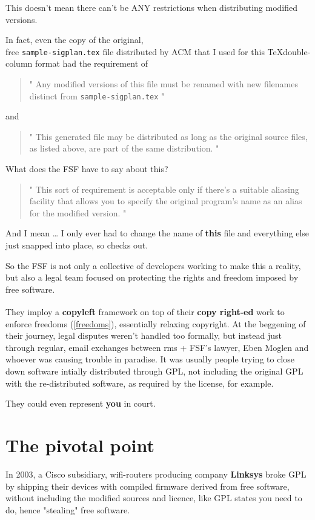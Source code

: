 \documentclass[sigplan,screen]{acmart}
\begin{document}
This doesn't mean there can't be ANY restrictions when distributing modified versions.

In fact, even the copy of the original, \\
free \verb|sample-sigplan.tex| file distributed by ACM that I used for this \TeX   double-column format had the requirement of

\begin{quote}
	"
	Any modified versions of this file must be renamed
 with new filenames distinct from \verb|sample-sigplan.tex|
	"
\end{quote}
and
\begin{quote}
	"
	This generated file may be distributed as long as the
 original source files, as listed above, are part of the
 same distribution.
	"
\end{quote}
What does the FSF have to say about this?
\begin{quote}
	"
	This sort of requirement is acceptable only if there's a suitable aliasing facility that allows you to specify the original program's name as an alias for the modified version.
	"
\end{quote}
And I mean … I only ever had to change the name of \textbf{this} file and everything else just snapped into place, so checks out.

So the FSF is not only a collective of developers working to make this a reality, but also a legal team focused on protecting the rights and freedom imposed by free software.

They imploy a \textbf{copyleft}\textsuperscript{\textcopyleft} framework on top of their \textbf{copy right-ed}\textsuperscript{\textcopyright} work to enforce freedoms (\ref{freedoms}), essentially relaxing copyright. At the beggening of their journey, legal disputes weren't handled too formally, but instead just through regular, email exchanges between rms + FSF's lawyer, Eben Moglen and whoever was causing trouble in paradise. It was usually people trying to close down software intially distributed through GPL, not including the original GPL with the re-distributed software, as required by the license, for example.

They could even represent \textbf{you} in court. \cite{about-gnu}

\section{The pivotal point}
In 2003, a Cisco subsidiary, wifi-routers producing company \textbf{Linksys} broke GPL by shipping their devices with compiled firmware derived from free software, without including the modified sources and licence, like GPL states you need to do, hence "stealing" free software. \cite{fsf-vs-cisco}
\end{document}

